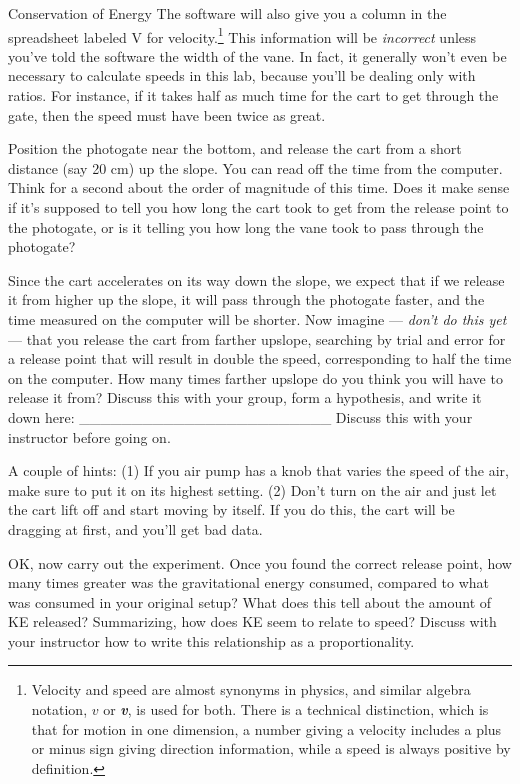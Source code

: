 \begin{lab}{Conservation of Energy}
The software will also give you a column in the spreadsheet labeled
V for velocity.\footnote{Velocity and speed are almost synonyms in
physics, and similar algebra notation, $v$ or \textit{\textbf{v}}, is used for both. There is
a technical distinction, which is that for motion in one dimension,
a number giving a velocity includes
a plus or minus sign giving direction information, while a speed is always
positive by definition.} This information will be \emph{incorrect} unless
you've told the software the width of the vane.
In fact, it generally won't even be necessary to calculate speeds in this
lab, because you'll be dealing only with ratios. For instance, if it takes
half as much time for the cart to get through the gate, then the speed must have
been twice as great.


Position the photogate near the bottom, and release the cart from
a short distance (say 20 cm) up the slope. You can read off the time
from the computer. Think for a second about the order of magnitude of
this time. Does it make sense if it's supposed to tell you how long the cart
took to get from the release point to the photogate, or is it telling
you how long the vane took to pass through the photogate?

Since the cart accelerates on its way down the slope,
we expect that if we release it from higher up the slope, it will pass
through the photogate faster, and the time measured on the computer will
be shorter. Now imagine --- \emph{don't do this yet} --- that you
release the cart from farther upslope, searching by trial and error for
a release point that will result in double the speed, corresponding to half
the time on the computer. How many times farther upslope do you think you
will have to release it from?
Discuss this with your group, form a hypothesis,
and write it down here:  \_\_\_\_\_\_\_\_\_\_\_\_\_\_\_\_\_\_\_\_\_\_\_\_
Discuss this with your instructor before going on.

A couple of hints: (1) If you air pump has a knob that varies the speed of
the air, make sure to put it on its highest setting. (2) Don't turn on the
air and just let the cart lift off and start moving by itself. If you do
this, the cart will be dragging at first, and you'll get bad data.

OK, now carry out the experiment. Once you found the correct release point,
how many times greater was the gravitational energy consumed, compared to what was consumed
in your original setup? What does this tell about the amount of KE released?
Summarizing, how does KE seem to relate to speed? Discuss with your
instructor how to write this relationship as a proportionality.


\end{lab}
